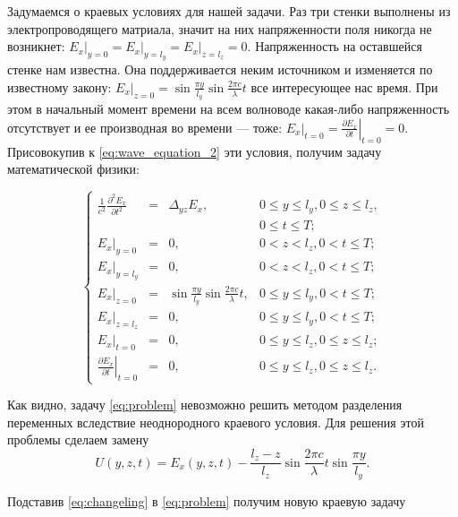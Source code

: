 Задумаемся о краевых условиях для нашей задачи. Раз три стенки выполнены из электропроводящего матриала, значит на них напряженности поля никогда не возникнет: $\left. E_x \right|_{y=0} = \left. E_x \right|_{y=l_y} = \left. E_x \right|_{z=l_z} = 0$. Напряженность на оставшейся стенке нам известна. Она поддерживается неким источником и изменяется по известному закону: $\left. E_x \right|_{z=0} = \sin\frac{\pi y}{l_y} \sin\frac{2 \pi c}{\lambda}t$ все интересующее нас время. При этом в начальный момент времени на всем волноводе какая-либо напряженность отсутствует и ее производная во времени --- тоже: $\left. E_x \right|_{t=0} = \left. \frac{\partial E_x}{\partial t} \right|_{t=0} = 0$. Присовокупив к \eqref{eq:wave_equation_2} эти условия, получим задачу математической физики:

\begin{equation}
  \label{eq:problem}
  \left\{
    \begin{array}{rclr}
      \frac{1}{c^2} \frac{\partial^2 E_x}{\partial t^2} &=& \Delta_{yz} E_x, & 0 \le y \le l_y,  0 \le z \le l_z, \\
      &&& 0 \le t \le T; \\
      \left. E_x \right|_{y=0} & = & 0, & 0 < z < l_z, 0 < t \le T; \\
      \left. E_x \right|_{y=l_y} & = & 0, & 0 < z < l_z, 0 < t \le T; \\
      \left. E_x \right|_{z=0} &=&  \sin\frac{\pi y}{l_y} \sin\frac{2 \pi c}{\lambda} t, & 0 \le y \le l_y, 0 < t \le T; \\
      \left. E_x \right|_{z=l_z} &=& 0, & 0 \le y \le l_y, 0 < t \le T; \\
      \left. E_x \right|_{t=0} & = & 0, & 0 \le y \le l_z, 0 \le z \le l_z; \\
      \left. \frac{\partial E_x}{\partial t} \right|_{t=0} &=& 0, & 0 \le y \le l_z, 0 \le z \le l_z.
    \end{array}
  \right.
\end{equation}

Как видно, задачу \eqref{eq:problem} невозможно решить методом разделения переменных вследствие неоднородного краевого условия. Для решения этой проблемы сделаем замену
\begin{equation}
  \label{eq:changeling}
  U(y, z, t) = E_x(y, z, t) - \frac{l_z - z}{l_z} \sin\frac{2 \pi c}{\lambda}t \sin\frac{\pi y}{l_y}.
\end{equation}

  Подставив \eqref{eq:changeling} в \eqref{eq:problem} получим новую краевую задачу

